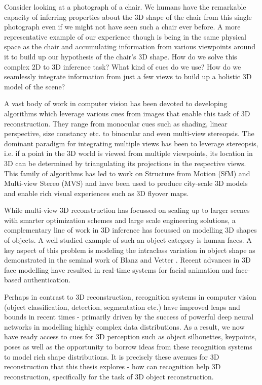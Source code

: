\documentclass[../thesis.tex]{subfiles}
\begin{document}
Consider looking at a photograph of a chair. We humans have the remarkable capacity of inferring properties about the 3D shape of the chair from this single photograph even if we might not have seen such a chair ever before. A more representative example of our experience though is being in the same physical space as the chair and accumulating information from various viewpoints around it to build up our hypothesis of the chair’s 3D shape. How do we solve this complex 2D to 3D inference task? What kind of cues do we use?
How do we seamlessly integrate information from just a few views to build up a holistic 3D model of the scene?

A vast body of work in computer vision has been devoted to developing algorithms which leverage various cues from images that enable this task of 3D reconstruction. They range from monocular cues such as shading, linear perspective, size constancy etc. \cite{palmer1999vision} to binocular and even multi-view stereopsis. The dominant paradigm for integrating multiple views has been to leverage stereopsis, i.e. if a point in the 3D world is viewed from multiple viewpoints, its location in 3D can be determined by triangulating its projections in the respective views. This family of algorithms has led to work on Structure from Motion (SfM) and Multi-view Stereo (MVS) and have been used to produce city-scale 3D models and enable rich visual experiences such as 3D flyover maps.

While multi-view 3D reconstruction has focussed on scaling up to larger scenes with smarter optimization schemes and large scale engineering solutions, a complementary line of work in 3D inference has focussed on modelling 3D shapes of objects. A well studied example of such an object category is human faces. A key aspect of this problem is modeling the intraclass variation in object shape as demonstrated in the seminal work of Blanz and Vetter \cite{blanz1999morphable}. Recent advances \cite{kemelmacher2011internet,movingFace:eccv14} in 3D face modelling have resulted in real-time systems for facial animation and face-based authentication. 

Perhaps in contrast to 3D reconstruction, recognition systems in computer vision (object classification, detection, segmentation etc.) have improved leaps and bounds in recent times - primarily driven by the success of powerful deep neural networks in modelling highly complex data distributions. As a result, we now have ready access to cues for 3D perception such as object silhouettes, keypoints, poses as well as the opportunity to borrow ideas from these recognition systems to model rich shape distributions. It is precisely these avenues for 3D reconstruction that this thesis explores - how can recognition help 3D reconstruction, specifically for the task of 3D object reconstruction. 
\end{document}
